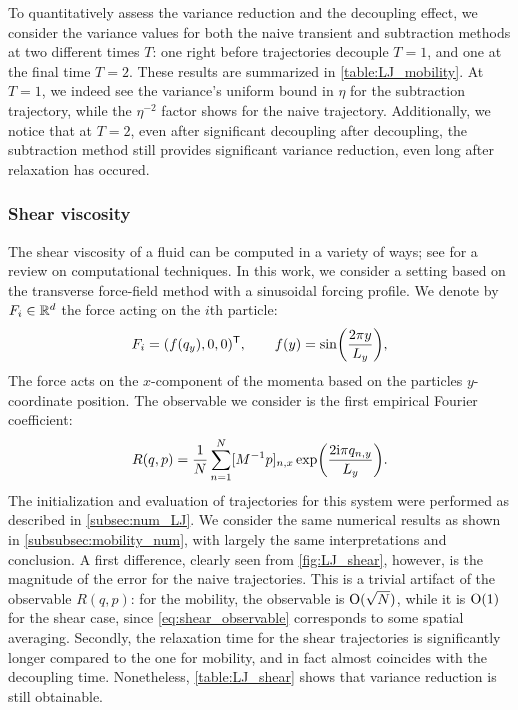 To quantitatively assess the variance reduction and the decoupling effect, we consider the variance values for both the naive transient and subtraction methods at two different times $T$: one right before trajectories decouple $T=1$, and one at the final time $T=2$. These results are summarized in \cref{table:LJ_mobility}. At $T=1$, we indeed see the variance's uniform bound in $\eta$ for the subtraction trajectory, while the $\eta^{-2}$ factor shows for the naive trajectory. Additionally, we notice that at $T=2$, even after significant decoupling after decoupling, the subtraction method still provides significant variance reduction, even long after relaxation has occured.

\subsubsection{Shear viscosity}
\label{subsubsec:shear}
%
The shear viscosity of a fluid can be computed in a variety of ways; see \cite{todd_shear2007} for a review on computational techniques. In this work, we consider a setting based on the transverse force-field method \cite{joubaud2012} with a sinusoidal forcing profile. We denote by $F_i\in\mathbb{R}^d$ the force acting on the $i$th particle:
%
\begin{equation}
    F_i = (f(q_y), 0, 0)^\t, \qquad  f(y) = \sin\paren*{\frac{2\pi y}{L_y}},
\end{equation}
%
The force acts on the $x$-component of the momenta based on the particles $y$-coordinate position.
%
%
%
The observable we consider is the first empirical Fourier coefficient:
%
\begin{equation}
    R(q,p) = \frac{1}{N}\sum_{n=1}^N [M^{-1}p]_{n,x}\exp\paren*{\frac{2\mathrm{i}\pi q_{n,y}}{L_y}}.
    \label{eq:shear_observable}
\end{equation}
%
The initialization and evaluation of trajectories for this system were performed as described in \cref{subsec:num_LJ}. We consider the same numerical results as shown in \cref{subsubsec:mobility_num}, with largely the same interpretations and conclusion. A first difference, clearly seen from \cref{fig:LJ_shear}, however, is the magnitude of the error for the naive trajectories. This is a trivial artifact of the observable $R(q,p)$: for the mobility, the observable is $\mathrm{O}(\sqrt{N})$, while it is $\mathrm{O}(1)$ for the shear case, since \eqref{eq:shear_observable} corresponds to some spatial averaging. Secondly, the relaxation time for the shear trajectories is significantly longer compared to the one for mobility, and in fact almost coincides with the decoupling time. Nonetheless, \cref{table:LJ_shear} shows that variance reduction is still obtainable.
%

